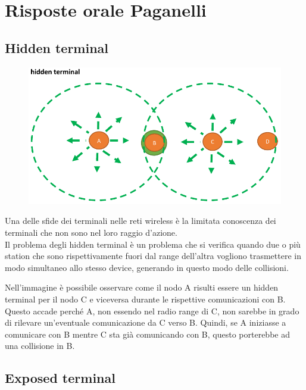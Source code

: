 \chapter{Risposte orale Paganelli}
\section{Hidden terminal}

\begin{figure}[htbp]
   \centering
   \includegraphics{images/questions/Schermata del 2023-11-01 15-19-50.png}
   \label{fig:dom2.1}
\end{figure}

Una delle sfide dei terminali nelle reti wireless è la limitata conoscenza dei terminali che non sono nel loro raggio d'azione. \\
Il problema degli hidden terminal è un problema che si verifica quando due o più station che sono rispettivamente fuori dal range dell'altra vogliono trasmettere in modo simultaneo allo stesso device, generando in questo modo delle collisioni.

Nell'immagine è possibile osservare come il nodo A risulti essere un hidden terminal per il nodo C e viceversa durante le rispettive comunicazioni con B. Questo accade perché A, non essendo nel radio range di C, non sarebbe in grado di rilevare un'eventuale comunicazione da C verso B. Quindi, se A iniziasse a comunicare con B mentre C sta già comunicando con B, questo porterebbe ad una collisione in B.

\section{Exposed terminal}

